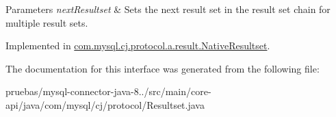 \begin{DoxyParams}{Parameters}
{\em next\+Resultset} & Sets the next result set in the result set chain for multiple result sets. \\
\hline
\end{DoxyParams}


Implemented in \mbox{\hyperlink{classcom_1_1mysql_1_1cj_1_1protocol_1_1a_1_1result_1_1_native_resultset_a69d6943f5f8f3e38a159e89897c583b2}{com.\+mysql.\+cj.\+protocol.\+a.\+result.\+Native\+Resultset}}.



The documentation for this interface was generated from the following file\+:\begin{DoxyCompactItemize}
\item 
pruebas/mysql-\/connector-\/java-\/8../src/main/core-\/api/java/com/mysql/cj/protocol/Resultset.\+java\end{DoxyCompactItemize}
